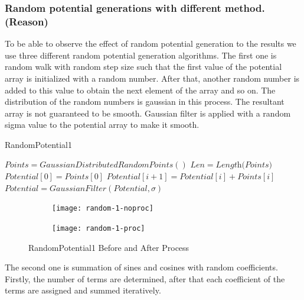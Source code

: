\documentclass[a4paper,times,hidelinks,12pt]{article}
\begin{document}
\subsubsection{Random potential generations with different method. (Reason)}
\label{sec:random_potential_gen}

To be able to observe the effect of random potential generation to the results we use three different random potential generation algorithms. The first one is random walk with random step size such that the first value of the potential array is initialized with a random number. After that, another random number is added to this value to obtain the next element of the array and so on. The distribution of the random numbers is gaussian in this process. The resultant array is not guaranteed to be smooth. Gaussian filter is applied with a random sigma value to the potential array to make it smooth.    

\begin{algorithm}[H]
    \caption{RandomPotential1}\label{euclid}
    \begin{algorithmic}[1]
        \State $ Points = GaussianDistributedRandomPoints()$
        \State $Len = \textit{Length(Points)}$
        \State $Potential[0] = Points[0]$
        \State $Potential[i + 1] = Potential[i] + Points[i]$
        \EndFor
        \State $Potential = GaussianFilter(Potential, \sigma)$ 
    \EndProcedure
    \end{algorithmic}
\label{alg:random_potential_1}
\end{algorithm}

\graphicspath{{"../figs/potentials/"}}
\begin{figure}[H]
    \centering
    \begin{subfigure}[t]{0.45\textwidth}
        \texttt{[image: random-1-noproc]}
		
    \end{subfigure}
    \begin{subfigure}[t]{0.45\textwidth}
        \texttt{[image: random-1-proc]}
		
    \end{subfigure}
\caption{RandomPotential1 Before and After Process}
\label{fig:random1_before_after}
\end{figure}



The second one is summation of sines and cosines with random coefficients. Firstly, the number of terms are determined, after that each coefficient of the terms are assigned and summed iteratively.
\end{document}
